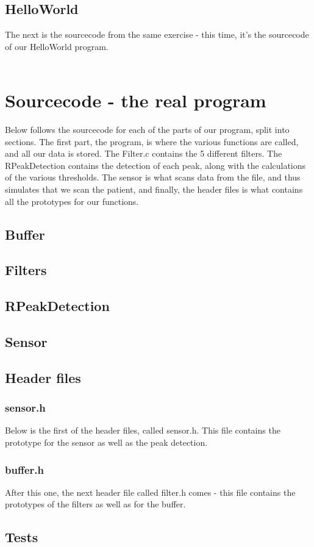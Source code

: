 \documentclass[12pt,a4paper]{article}
\begin{document}
\subsection{HelloWorld}
	The next is the sourcecode from the same exercise - this time, it's the sourcecode of our HelloWorld program.\\
	\\
	
	
\section{Sourcecode - the real program}
	Below follows the sourcecode for each of the parts of our program, split into sections. The first part, the program, is where the various functions are called, and all our data is stored. The Filter.c contains the 5 different filters. The RPeakDetection contains the detection of each peak, along with the calculations of the various thresholds. The sensor is what scans data from the file, and thus simulates that we scan the patient, and finally, the header files is what contains all the prototypes for our functions.
\subsection{Buffer}
		
\subsection{Filters}
	
\subsection{RPeakDetection}
		
\subsection{Sensor}
		
\subsection{Header files}
\subsubsection{sensor.h}
	Below is the first of the header files, called sensor.h. This file contains the prototype for the sensor as well as the peak detection.\\
	
\subsubsection{buffer.h}
	After this one, the next header file called filter.h comes - this file contains the prototypes of the filters as well as for the buffer.\\
	
\subsection{Tests}
	\label{Tests}
	
\end{document}

